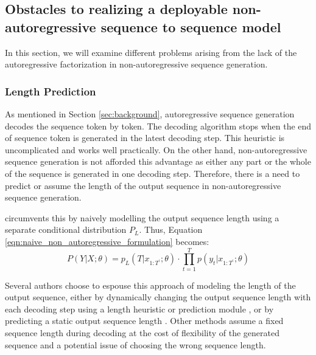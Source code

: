 \subsection{Obstacles to realizing a deployable non-autoregressive sequence to sequence model} 
\label{subsec:obstacles_NAT}
In this section, we will examine different problems arising from the lack of the autoregressive factorization in non-autoregressive sequence generation.
\subsubsection{Length Prediction} \label{subsubsec:nat_prob_length}
As mentioned in Section \ref{sec:background}, autoregressive sequence generation decodes the sequence token by token. The decoding algorithm stops when the end of sequence token is generated in the latest decoding step. This heuristic is uncomplicated and works well practically. On the other hand, non-autoregressive sequence generation is not afforded this advantage as either any part or the whole of the sequence is generated in one decoding step. Therefore, there is a need to predict or assume the length of the output sequence in non-autoregressive sequence generation. 

\textcite{gu_non-autoregressive_2018} circumvents this by naively modelling the output sequence length using a separate conditional distribution $P_L$. Thus, Equation \ref{eqn:naive_non_autoregressive_formulation} becomes:
\begin{equation}
\label{eqn:gu_non_autoregressive_formulation} 
P(Y|X;\theta) = p_L(T|x_{1:T^\prime};\theta) \cdot \prod_{t=1}^{T}p(y_t|x_{1:T^\prime};\theta)
\end{equation}

Several authors choose to espouse this approach of modeling the length of the output sequence, either by dynamically changing the output sequence length with each decoding step using a length heuristic or prediction module \cite{gu_levenshtein_2019,chan_kermit_2019,chan_multilingual_kermit,ran_learning_to_recover_2020,stern_insertion_2019,zhou_improving_2020_with_monolingual_data, ran_guiding_2020_reordering,ma_flowseq_2019}, or by predicting a static output sequence length \cite{gu_non-autoregressive_2018,zhou_improving_2020_with_monolingual_data,ghazvininejad_mask-predict_2019, qian_glancing_2020}. Other methods assume a fixed sequence length during decoding \cite{wang_semi-autoregressive_2018,guo_non-autoregressive_2020_image_captioning,saharia_non-autoregressive_2020_latent_alignment,chan_imputer_2020,bao_non-autoregressive_2019_position_learning, guo_fine-tuning_2019_curriculum,ding_context-aware_2020} at the cost of flexibility of the generated sequence and a potential issue of choosing the wrong sequence length.

